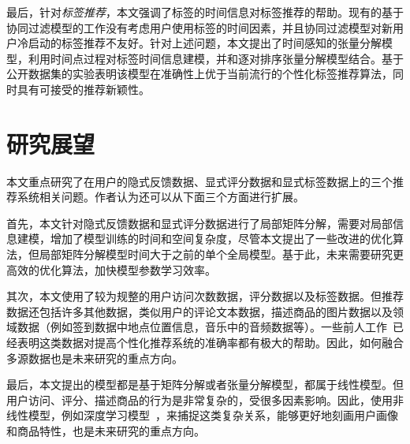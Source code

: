 最后，针对\textit{标签推荐}，本文强调了标签的时间信息对标签推荐的帮助。现有的基于协同过滤模型的工作没有考虑用户使用标签的时间因素，并且协同过滤模型对新用户冷启动的标签推荐不友好。针对上述问题，本文提出了时间感知的张量分解模型，利用时间点过程对标签时间信息建模，并和逐对排序张量分解模型结合。基于公开数据集的实验表明该模型在准确性上优于当前流行的个性化标签推荐算法，同时具有可接受的推荐新颖性。

\section{研究展望}
本文重点研究了在用户的隐式反馈数据、显式评分数据和显式标签数据上的三个推荐系统相关问题。作者认为还可以从下面三个方面进行扩展。

首先，本文针对隐式反馈数据和显式评分数据进行了局部矩阵分解，需要对局部信息建模，增加了模型训练的时间和空间复杂度，尽管本文提出了一些改进的优化算法，但局部矩阵分解模型时间大于之前的单个全局模型。基于此，未来需要研究更高效的优化算法，加快模型参数学习效率。
	
其次，本文使用了较为规整的用户访问次数数据，评分数据以及标签数据。但推荐数据还包括许多其他数据，类似用户的评论文本数据，描述商品的图片数据以及领域数据（例如签到数据中地点位置信息，音乐中的音频数据等）。一些前人工作~\cite{he2015vbpr,li2016point,wang2017your,zheng2017joint}已经表明这类数据对提高个性化推荐系统的准确率都有极大的帮助。因此，如何融合多源数据也是未来研究的重点方向。
	
最后，本文提出的模型都是基于矩阵分解或者张量分解模型，都属于线性模型。但用户访问、评分、描述商品的行为是非常复杂的，受很多因素影响。因此，使用非线性模型，例如深度学习模型~\cite{wang2015collaborative,he2017neural}，来捕捉这类复杂关系，能够更好地刻画用户画像和商品特性，也是未来研究的重点方向。

\clearpage
\phantom{s}
\clearpage
